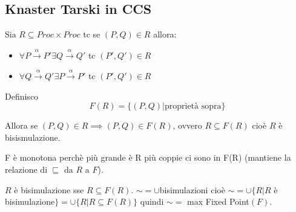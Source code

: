 \documentclass{article}
\newcommand{\passo}{\xrightarrow{\alpha}}
\begin{document}
\begin{comment}
Siccome $f: U \to U $ e U è un reticolo completo in quanto intervallo di un reticolo completo ($L$), e per \textbf{Punto 1} e \textbf{Punto 2} vale che $f:U \to U$ con $U$ reticolo completo ha lub e glb  in U $\implies f$ ha lub e glb in $U$ e lub=greatest fixed point e glb=least fixed point di $f$ in U.


Siccome $s \sqsubseteq x \forall x \in U$ allora s è il greatest lower bound di U, quindi s = least fixed point di $f$ in $U$. Allora $S$ ha lub in $F$ perchè il lub di $S = s =$ least fixed point di $f$ in $U$ e quindi $\in F$.\\

Analogamente i può dimostrare che $S$ ha glb in $F$, e siccome questo vale $\forall S \subseteq P \implies P$ è un reticolo completo
\end{comment}

\subsection{Knaster Tarski in CCS}

Sia $R \subseteq Proc \times Proc$ tc se $(P, Q) \in R$ allora:
\begin{itemize}
    \item $\forall P \passo P' \exists Q \passo Q'$ tc $(P', Q') \in R$
    \item $\forall Q \passo Q' \exists P \passo P'$ tc $(P', Q') \in R$
\end{itemize}

Definisco $$F(R) = \{ (P,Q) | \text{proprietà sopra} \} $$

Allora se $(P,Q) \in R \implies (P,Q) \in F(R)$, ovvero $R \subseteq F(R)$ cioè $R$ è bisismulazione.

F è monotona perchè più grande è R più coppie ci sono in F(R) (mantiene la relazione di $\sqsubseteq$ da $R$ a $F$).

$R$ è bisimulazione sse $R \subseteq F(R)$. $ \sim= \cup$bisimulazioni cioè $\sim = \cup \{ R |R $ è bisimulazione$\} = \cup \{R | R \subseteq F(R)\} $ quindi $\sim = $ max Fixed Point$(F)$.
\end{document}
